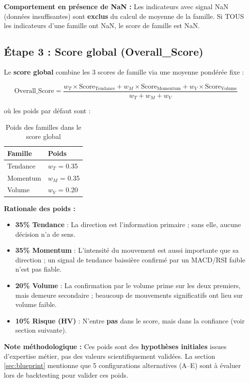 \documentclass{rapportENSIAS} %
\begin{document}
\noindent
\textbf{Comportement en présence de NaN :} Les indicateurs avec signal NaN (données insuffisantes) sont \textbf{exclus} du calcul de moyenne de la famille. Si TOUS les indicateurs d'une famille ont NaN, le score de famille est NaN.

\subsection{Étape 3 : Score global (Overall\_Score)}

\noindent
Le \textbf{score global} combine les 3 scores de famille via une moyenne pondérée fixe :

\[
\text{Overall\_Score} = \frac{w_T \times \text{Score}_{\text{Tendance}} + w_M \times \text{Score}_{\text{Momentum}} + w_V \times \text{Score}_{\text{Volume}}}{w_T + w_M + w_V}
\]

\noindent
où les poids par défaut sont :

\begin{table}[H]
\centering
\begin{tabular}{ll}
\toprule
\textbf{Famille} & \textbf{Poids} \\
\midrule
Tendance & $w_T$ = 0.35 \\
Momentum & $w_M$ = 0.35 \\
Volume   & $w_V$ = 0.20 \\
\bottomrule
\end{tabular}
\caption{Poids des familles dans le score global}
\label{tab:weights}
\end{table}

\noindent
\textbf{Rationale des poids :}
\begin{itemize}
    \item \textbf{35\% Tendance} : La direction est l'information primaire ; sans elle, aucune décision n'a de sens.
    \item \textbf{35\% Momentum} : L'intensité du mouvement est aussi importante que sa direction ; un signal de tendance baissière confirmé par un MACD/RSI faible n'est pas fiable.
    \item \textbf{20\% Volume} : La confirmation par le volume prime sur les deux premiers, mais demeure secondaire ; beaucoup de mouvements significatifs ont lieu sur volume faible.
    \item \textbf{10\% Risque (HV)} : N'entre \textbf{pas} dans le score, mais dans la confiance (voir section suivante).
\end{itemize}

\noindent
\textbf{Note méthodologique :} Ces poids sont des \textbf{hypothèses initiales} issues d'expertise métier, pas des valeurs scientifiquement validées. La section \ref{sec:blueprint} mentionne que 5 configurations alternatives (A–E) sont à évaluer lors de backtesting pour valider ces poids.
\end{document}
